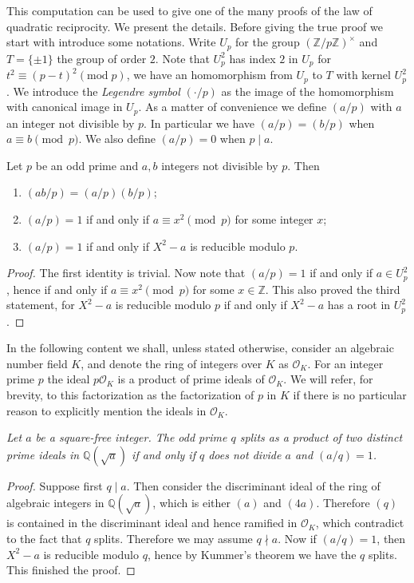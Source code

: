 This computation can be used to give one of the many proofs of the law of quadratic reciprocity. We present the details. Before giving the true proof we start with introduce some notations. Write $U_p$ for the group $(\mathbb{Z}/p\mathbb{Z})^\times$ and $T=\{\pm 1\}$ the group of order $2$. Note that $U_p^2$ has index $2$ in $U_p$ for $t^2\equiv \left( p-t \right) ^2\left( \mathrm{mod}\;p \right) $, we have an homomorphism from $U_p$ to $T$ with kernel $U_p^2$. We introduce the \textit{Legendre symbol} $(\cdot/p)$ as the image of the homomorphism with canonical image in $U_p$. As a matter of convenience we define $(a/p)$ with $a$ an integer not divisible by $p$. In particular we have $(a/p)=(b/p)$ when $a\equiv b\pmod{p}$. We also define $(a/p)=0$ when $p\mid a$.
\begin{proposition}
Let $p$ be an odd prime and $a,b$ integers not divisible by $p$. Then 
\begin{enumerate}
    \item $(ab/p)=(a/p)(b/p)$;
    \item $(a/p)=1$ if and only if $a\equiv x^2\pmod{p}$ for some integer $x$;
    \item $(a/p)=1$ if and only if $X^2-a$ is reducible modulo $p$.
\end{enumerate}
\end{proposition}
\begin{proof}
The first identity is trivial. Now note that $(a/p)=1$ if and only if $a\in U_p^2$, hence if and only if $a\equiv x^2\pmod{p}$ for some $x\in\mathbb{Z}$. This also proved the third statement, for $X^2-a$ is reducible modulo $p$ if and only if $X^2-a$ has a root in $U_p^2$.
\end{proof}
In the following content we shall, unless stated otherwise, consider an algebraic number field $K$, and denote the ring of integers over $K$ as $\mathcal{O}_K$. For an integer prime $p$ the ideal $p\mathcal{O}_K$ is a product of prime ideals of $\mathcal{O}_K$. We will refer, for brevity, to this factorization as the factorization of $p$ in $K$ if there is no particular reason to explicitly mention the ideals in $\mathcal{O}_K$.
\begin{lemma}\em
Let $a$ be a square-free integer. The odd prime $q$ splits as a product of two distinct prime ideals in $\mathbb{Q}(\sqrt{a})$ if and only if $q$ does not divide $a$ and $(a/q)=1$.
\end{lemma}
\begin{proof}
Suppose first $q\mid a$. Then consider the discriminant ideal of the ring of algebraic integers in $\mathbb{Q}(\sqrt{a})$, which is either $(a)$ and $(4a)$. Therefore $(q)$ is contained in the discriminant ideal and hence ramified in $\mathcal{O}_K$, which contradict to the fact that $q$ splits. Therefore we may assume $q\nmid a$. Now if $(a/q)=1$, then $X^2-a$ is reducible modulo $q$, hence by Kummer's theorem we have the $q$ splits. This finished the proof.
\end{proof}
